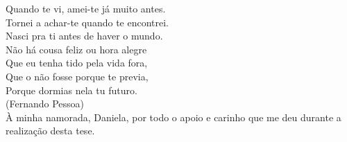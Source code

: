 
\null\vskip5cm%
\begin{flushright}
     Quando te vi, amei-te já muito antes.\\
     Tornei a achar-te quando te encontrei.\\
     Nasci pra ti antes de haver o mundo.\\
     Não há cousa feliz ou hora alegre\\
     Que eu tenha tido pela vida fora,\\
     Que o não fosse porque te previa,\\
     Porque dormias nela tu futuro.\\
     (Fernando Pessoa) \\
     À minha namorada, Daniela, por todo o apoio e carinho que me deu durante a realização desta tese.
\end{flushright}
\vfill\newpage

